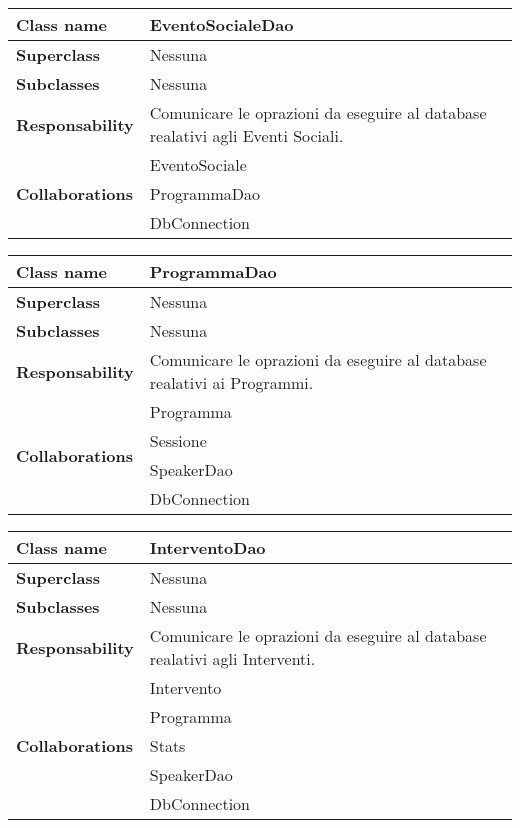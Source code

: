 \begin{table}[h!]
	\begin{tabular}{|l|l|}
		\hline 
		\textbf{Class name} & EventoSocialeDao
		\\ \hline
		\textbf{Superclass} & Nessuna
		\\ \hline
		\multirow{1}{*}{\textbf{Subclasses}} & Nessuna
		\\ \hline
		\textbf{Responsability} & Comunicare le oprazioni da eseguire al database realativi agli Eventi Sociali.
		\\ \hline
		\multirow{3}{*}{\textbf{Collaborations}} & EventoSociale \\ 
		& ProgrammaDao \\
		& DbConnection \\ \hline
	\end{tabular}
\end{table}

\begin{table}[h!]
	\begin{tabular}{|l|l|}
		\hline 
		\textbf{Class name} & ProgrammaDao
		\\ \hline
		\textbf{Superclass} & Nessuna
		\\ \hline
		\multirow{1}{*}{\textbf{Subclasses}} & Nessuna
		\\ \hline
		\textbf{Responsability} & Comunicare le oprazioni da eseguire al database realativi ai Programmi.
		\\ \hline
		\multirow{4}{*}{\textbf{Collaborations}} & Programma \\ 
		& Sessione \\
		& SpeakerDao \\
		& DbConnection \\ \hline
	\end{tabular}
\end{table}

\begin{table}[h!]
	\begin{tabular}{|l|l|}
		\hline 
		\textbf{Class name} & InterventoDao
		\\ \hline
		\textbf{Superclass} & Nessuna
		\\ \hline
		\multirow{1}{*}{\textbf{Subclasses}} & Nessuna
		\\ \hline
		\textbf{Responsability} & Comunicare le oprazioni da eseguire al database realativi agli Interventi.
		\\ \hline
		\multirow{5}{*}{\textbf{Collaborations}} & Intervento \\ 
		& Programma \\
		& Stats \\
		& SpeakerDao \\
		& DbConnection \\ \hline
	\end{tabular}
\end{table}

